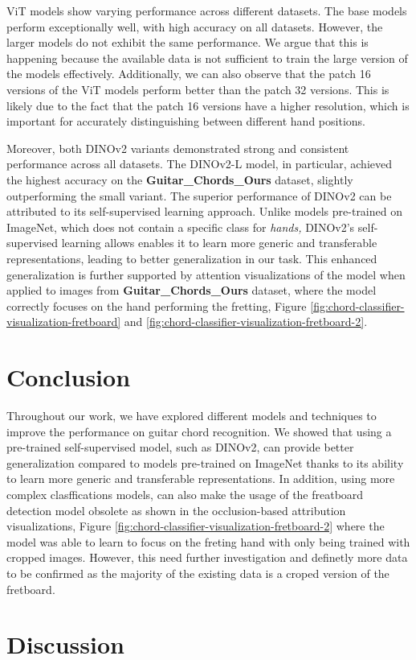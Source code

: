 \documentclass[10pt,twocolumn,letterpaper]{article}
\begin{document}
ViT models show varying performance across different datasets. The base models perform exceptionally well, with high accuracy on all datasets. However, the larger models do not exhibit the same performance. We argue that this is happening because the available data is not sufficient to train the large version of the models effectively. Additionally, we can also observe that the patch 16 versions of the ViT models perform better than the patch 32 versions. This is likely due to the fact that the patch 16 versions have a higher resolution, which is important for accurately distinguishing between different hand positions.

Moreover, both DINOv2 variants demonstrated strong and consistent performance across all datasets. The DINOv2-L model, in particular, achieved the highest accuracy on the \textbf{Guitar\_Chords\_Ours} dataset, slightly outperforming the small variant. The superior performance of DINOv2 can be attributed to its self-supervised learning approach. Unlike models pre-trained on ImageNet, which does not contain a specific class for \emph{hands,} DINOv2's self-supervised learning allows enables it to learn more generic and transferable representations, leading to better generalization in our task. This enhanced generalization is further supported by attention visualizations of the model when applied to images from \textbf{Guitar\_Chords\_Ours} dataset, where the model correctly focuses on the hand performing the fretting, Figure \ref{fig:chord-classifier-visualization-fretboard} and \ref{fig:chord-classifier-visualization-fretboard-2}. 

\section{Conclusion}
Throughout our work, we have explored different models and techniques to improve the performance on guitar chord recognition.  We showed that using a pre-trained self-supervised model, such as DINOv2, can provide better generalization compared to models pre-trained on ImageNet thanks to its ability to learn more generic and transferable representations. In addition, using more complex clasffications models, can also make the usage of the freatboard detection model obsolete as shown in the occlusion-based attribution visualizations, Figure \ref{fig:chord-classifier-visualization-fretboard-2} where the model was able to learn to focus on the freting hand with only being trained with cropped images. However, this need further investigation and definetly more data to be confirmed as the majority of the existing data is a croped version of the fretboard.


\section{Discussion}


    {\small
        
        
    }
\end{document}
